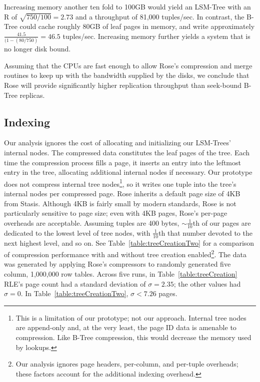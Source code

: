 \documentclass{vldb}
\newcommand{\rows}{Rose\xspace}
\newcommand{\rowss}{Rose's\xspace}
\begin{document}

Increasing memory another ten fold to 100GB would yield an LSM-Tree
with an R of $\sqrt{750/100} = 2.73$ and a throughput of 81,000
tuples/sec.  In contrast, the B-Tree could cache roughly 80GB of leaf pages
in memory, and write approximately $\frac{41.5}{(1-(80/750)} = 46.5$
tuples/sec.  Increasing memory further yields a system that
is no longer disk bound.

Assuming that the CPUs are fast enough to allow \rowss
compression and merge routines to keep up with the bandwidth supplied
by the disks, we conclude that \rows will provide significantly higher
replication throughput than seek-bound B-Tree replicas.

\subsection{Indexing}

Our analysis ignores the cost of allocating and initializing our
LSM-Trees' internal nodes.  The compressed data constitutes the leaf
pages of the tree.  Each time the compression process fills a page, it
inserts an entry into the leftmost entry in the tree, allocating
additional internal nodes if necessary.  Our prototype does not compress
internal tree nodes\footnote{This is a limitation of our prototype;
  not our approach.  Internal tree nodes are append-only and, at the
  very least, the page ID data is amenable to compression. Like B-Tree
  compression, this would decrease the memory used by lookups.},
so it writes one tuple into the tree's internal nodes per compressed
page.  \rows inherits a default page size of 4KB from Stasis.
Although 4KB is fairly small by modern
standards, \rows is not particularly sensitive to page size; even with
4KB pages, \rowss per-page overheads are acceptable.  Assuming tuples
are 400 bytes, $\sim\frac{1}{10}$th of our pages are dedicated to the
lowest level of tree nodes, with $\frac{1}{10}$th that number devoted
to the next highest level, and so on.  See
Table~\ref{table:treeCreationTwo} for a comparison of compression
performance with and without tree creation enabled\footnote{Our
  analysis ignores page headers, per-column, and per-tuple overheads;
  these factors account for the additional indexing overhead.}.  The
data was generated by applying \rowss compressors to randomly
generated five column, 1,000,000 row tables.  Across five runs, in
Table~\ref{table:treeCreation} RLE's page count had a standard
deviation of $\sigma=2.35$; the other values had $\sigma=0$.  In
Table~\ref{table:treeCreationTwo}, $\sigma < 7.26$ pages.
\end{document}
